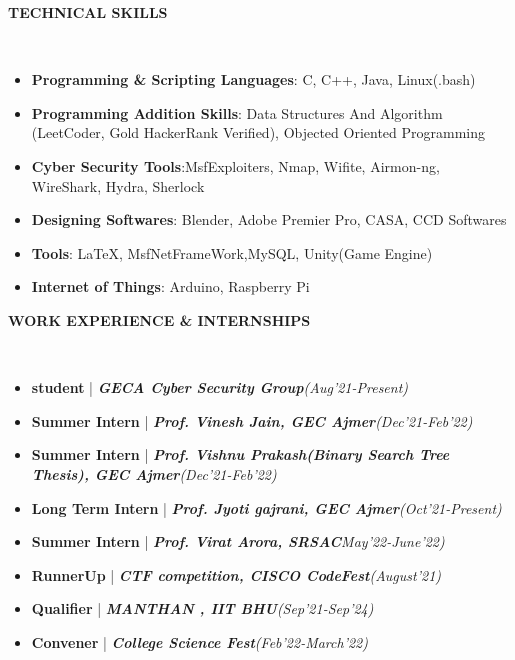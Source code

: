 \documentclass[a4paper,10pt]{article}
\newcommand{\resheading}[1]{{\small \colorbox{mygrey}{\begin{minipage}{0.99\textwidth}{\textbf{#1 \vphantom{p\^{E}}}}\end{minipage}}}}
\begin{document}
\noindent
\resheading{\textbf{TECHNICAL SKILLS}}\\[-0.4cm]
 \begin{itemize}
  \item \textbf{Programming \& Scripting Languages}: C, C++, Java, Linux(.bash)\\[-0.6cm]
  \item \textbf{Programming Addition Skills}: Data Structures And Algorithm (LeetCoder, Gold HackerRank Verified), Objected Oriented Programming \\[-0.6cm]
  \item \textbf{Cyber Security Tools}:MsfExploiters, Nmap, Wifite, Airmon-ng, WireShark, Hydra, Sherlock\\[-0.5cm]
  \item \textbf{Designing Softwares}: Blender, Adobe Premier Pro, CASA, CCD Softwares\\[-0.5cm]
  \item \textbf{Tools}: \LaTeX, MsfNetFrameWork,MySQL, Unity(Game Engine)\\[-0.5cm]
  \item \textbf{Internet of Things}: Arduino, Raspberry Pi\\[-0.5cm]
  \end{itemize}

\noindent
\resheading{\textbf{WORK EXPERIENCE \& INTERNSHIPS}}\\[-0.3cm]
\begin{itemize}
    
    \item \textbf{student} | \textbf{\emph{GECA Cyber Security Group}}\hfill \emph{(Aug’21-Present)}\\[-0.6cm]
    \item \textbf{Summer Intern} | \textbf{\emph{Prof. Vinesh Jain, GEC Ajmer}}\hfill \emph{(Dec’21-Feb'22)}\\[-0.6cm]
     \item \textbf{Summer Intern} | \textbf{\emph{Prof. Vishnu Prakash(Binary Search Tree Thesis), GEC Ajmer}}\hfill \emph{(Dec’21-Feb'22)}\\[-0.6cm]
    \item \textbf{Long Term Intern} | \textbf{\emph{Prof. Jyoti gajrani, GEC Ajmer}}\hfill \emph{(Oct’21-Present)}\\[-0.6cm]
    \item \textbf{Summer Intern} | \textbf{\emph{Prof. Virat Arora, SRSAC}}\hfill \emph{May'22-June'22)}\\[-0.6cm]
    \item \textbf{RunnerUp} | \textbf{\emph{CTF competition, CISCO CodeFest}}\hfill \emph{(August’21)}\\[-0.6cm]
    \item \textbf{Qualifier} | \textbf{\emph{MANTHAN , IIT BHU}}\hfill \emph{(Sep'21-Sep'24)}\\[-0.6cm]
    \item \textbf{Convener} | \textbf{\emph{College Science Fest}}\hfill \emph{(Feb’22-March'22)}\\[-0.6cm]
\end{itemize}
\end{document}
